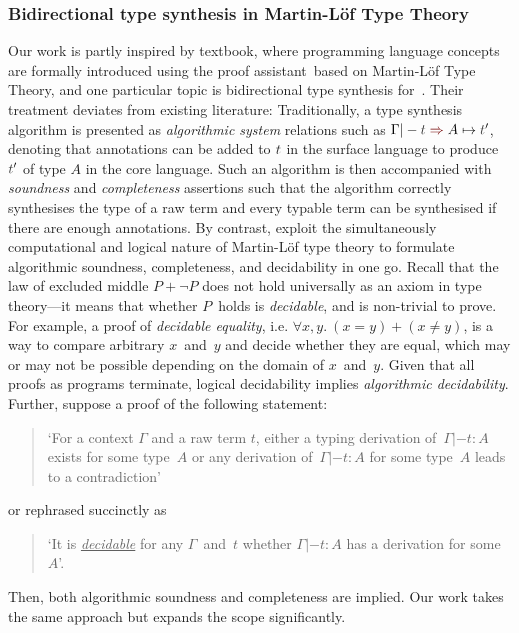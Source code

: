 \subsubsection{Bidirectional type synthesis in Martin-L\"of Type Theory}
\label{sec:PLFA}

Our work is partly inspired by  textbook, where programming language concepts are formally introduced using the proof assistant~\Agda based on Martin-L\"of Type Theory, and one particular topic is bidirectional type synthesis for~\PCF.
Their treatment deviates from existing literature:
Traditionally, a type synthesis algorithm is presented as \emph{algorithmic system} relations such as $\Gamma |- \isTerm{t} \syn A \mapsto \isTerm{t}'$, denoting that annotations can be added to $\isTerm{t}$ in the surface language to produce $\isTerm{t}'$ of type $A$ in the core language.
Such an algorithm is then accompanied with \emph{soundness} and \emph{completeness} assertions such that the algorithm correctly synthesises the type of a raw term and every typable term can be synthesised if there are enough annotations.
By contrast, \citeauthor{Wadler2022} exploit the simultaneously computational and logical nature of Martin-L\"of type theory to formulate algorithmic soundness, completeness, and decidability in one go.
Recall that the law of excluded middle $P + \neg P$ does not hold universally as an axiom in type theory---it means that whether $P$~holds is \emph{decidable}, and is non-trivial to prove.
For example, a proof of \emph{decidable equality}, i.e. $\forall x, y.~(x = y) + (x \neq y)$, is a way to compare arbitrary $x$~and~$y$ and decide whether they are equal, which may or may not be possible depending on the domain of $x$~and~$y$.
Given that all proofs as programs terminate, logical decidability implies \emph{algorithmic decidability}.
Further, suppose a proof of the following statement:
\begin{quote}
  `For a context $\Gamma$ and a raw term $t$, either a typing derivation of\, $\Gamma |- t : A$ exists for some type~$A$ or any derivation of\, $\Gamma |- t : A$ for some type~$A$ leads to a contradiction'
\end{quote}
or rephrased succinctly as 
\begin{quote}
  `It is \underline{\emph{decidable}} for any $\Gamma$~and~$t$ whether $\Gamma |- t : A$ has a derivation for some~$A$'.
\end{quote}
Then, both algorithmic soundness and completeness are implied.
Our work takes the same approach but expands the scope significantly.

